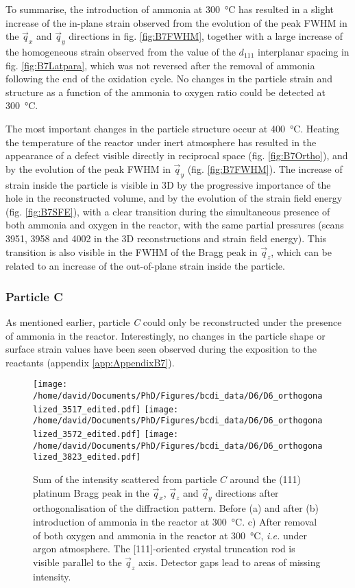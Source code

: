 To summarise, the introduction of ammonia at \qty{300}{\degreeCelsius} has resulted in a slight increase of the in-plane strain observed from the evolution of the peak FWHM in the $\vec{q}_x$ and $\vec{q}_y$ directions in fig. \ref{fig:B7FWHM}, together with a large increase of the homogeneous strain observed from the value of the $d_{111}$ interplanar spacing in fig. \ref{fig:B7Latpara}, which was not reversed after the removal of ammonia following the end of the oxidation cycle.
No changes in the particle strain and structure as a function of the ammonia to oxygen ratio could be detected at \qty{300}{\degreeCelsius}.

The most important changes in the particle structure occur at \qty{400}{\degreeCelsius}.
Heating the temperature of the reactor under inert atmosphere has resulted in the appearance of a defect visible directly in reciprocal space (fig. \ref{fig:B7Ortho}), and by the evolution of the peak FWHM in $\vec{q}_y$ (fig. \ref{fig:B7FWHM}).
The increase of strain inside the particle is visible in 3D by the progressive importance of the hole in the reconstructed volume, and by the evolution of the strain field energy (fig. \ref{fig:B7SFE}), with a clear transition during the simultaneous presence of both ammonia and oxygen in the reactor, with the same partial pressures (scans 3951, 3958 and 4002 in the 3D reconstructions and strain field energy).
This transition is also visible in the FWHM of the Bragg peak in $\vec{q}_z$, which can be related to an increase of the out-of-plane strain inside the particle.

\subsubsection{Particle C}

As mentioned earlier, particle \textit{C} could only be reconstructed under the presence of ammonia in the reactor.
Interestingly, no changes in the particle shape or surface strain values have been seen observed during the exposition to the reactants (appendix \ref{app:AppendixB7}).

\begin{figure}[!htb]
    \centering
    \texttt{[image: /home/david/Documents/PhD/Figures/bcdi\_data/D6/D6\_orthogonalized\_3517\_edited.pdf]}
    \texttt{[image: /home/david/Documents/PhD/Figures/bcdi\_data/D6/D6\_orthogonalized\_3572\_edited.pdf]}
    \texttt{[image: /home/david/Documents/PhD/Figures/bcdi\_data/D6/D6\_orthogonalized\_3823\_edited.pdf]}
    \caption{
        Sum of the intensity scattered from particle $C$ around the (111) platinum Bragg peak in the $\vec{q}_x$, $\vec{q}_z$ and $\vec{q}_y$ directions after orthogonalisation of the diffraction pattern.
        Before (a) and after (b) introduction of ammonia in the reactor at \qty{300}{\degreeCelsius}.
        c) After removal of both oxygen and ammonia in the reactor at \qty{300}{\degreeCelsius}, \textit{i.e.} under argon atmosphere.
        The [111]-oriented crystal truncation rod is visible parallel to the $\vec{q}_z$ axis.
        Detector gaps lead to areas of missing intensity.
    }
    \label{fig:D6Ortho}
\end{figure}

